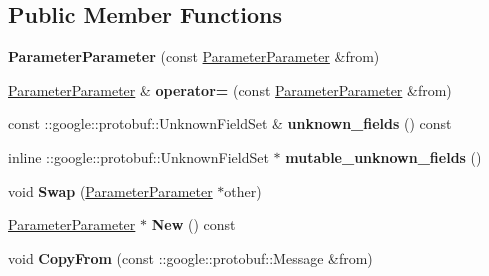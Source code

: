 \subsection*{Public Member Functions}
\begin{DoxyCompactItemize}
\item 
\mbox{\label{classcaffe_1_1_parameter_parameter_ad30e9bd0b6b05e2b389485f6e9b66a2a}} 
{\bfseries Parameter\+Parameter} (const \mbox{\hyperlink{classcaffe_1_1_parameter_parameter}{Parameter\+Parameter}} \&from)
\item 
\mbox{\label{classcaffe_1_1_parameter_parameter_aca5dff5d4af60894e60df1ffce0add56}} 
\mbox{\hyperlink{classcaffe_1_1_parameter_parameter}{Parameter\+Parameter}} \& {\bfseries operator=} (const \mbox{\hyperlink{classcaffe_1_1_parameter_parameter}{Parameter\+Parameter}} \&from)
\item 
\mbox{\label{classcaffe_1_1_parameter_parameter_a55ebbb2503aefae1ce20947f6de77da5}} 
const \+::google\+::protobuf\+::\+Unknown\+Field\+Set \& {\bfseries unknown\+\_\+fields} () const
\item 
\mbox{\label{classcaffe_1_1_parameter_parameter_ad16d5339deeac55dfb8941bf98ca9999}} 
inline \+::google\+::protobuf\+::\+Unknown\+Field\+Set $\ast$ {\bfseries mutable\+\_\+unknown\+\_\+fields} ()
\item 
\mbox{\label{classcaffe_1_1_parameter_parameter_a5e9faa2bc95df3a7a3b37aeb7045cda0}} 
void {\bfseries Swap} (\mbox{\hyperlink{classcaffe_1_1_parameter_parameter}{Parameter\+Parameter}} $\ast$other)
\item 
\mbox{\label{classcaffe_1_1_parameter_parameter_ac0edb0a468a735e1dd9210ca1cc60ff7}} 
\mbox{\hyperlink{classcaffe_1_1_parameter_parameter}{Parameter\+Parameter}} $\ast$ {\bfseries New} () const
\item 
\mbox{\label{classcaffe_1_1_parameter_parameter_a9571a1afee9af22d8095143c34bd7714}} 
void {\bfseries Copy\+From} (const \+::google\+::protobuf\+::\+Message \&from)
\item 

\end{DoxyCompactItemize}
